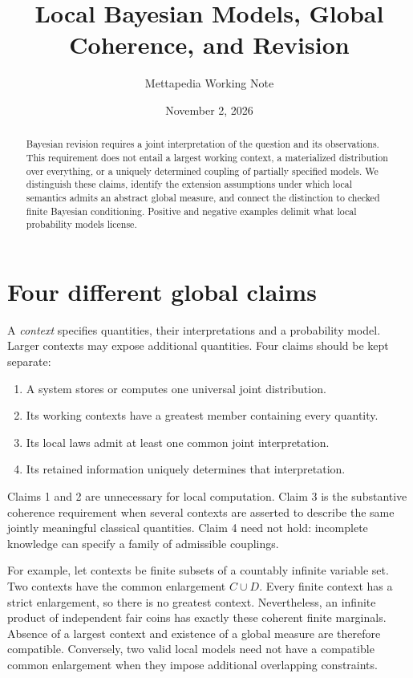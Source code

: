 \documentclass[11pt]{article}
\title{Local Bayesian Models, Global Coherence, and Revision}
\author{Mettapedia Working Note}
\date{November 2, 2026}
\begin{document}
\maketitle
\begin{abstract}
Bayesian revision requires a joint interpretation of the question and its
observations. This requirement does not entail a largest working context,
a materialized distribution over everything, or a uniquely determined coupling
of partially specified models. We distinguish these claims, identify the
extension assumptions under which local semantics admits an abstract global
measure, and connect the distinction to checked finite Bayesian conditioning.
Positive and negative examples delimit what local probability models license.
\end{abstract}

\section{Four different global claims}
A \emph{context} specifies quantities, their interpretations and a probability
model. Larger contexts may expose additional quantities. Four claims should
be kept separate:
\begin{enumerate}
\item A system stores or computes one universal joint distribution.
\item Its working contexts have a greatest member containing every quantity.
\item Its local laws admit at least one common joint interpretation.
\item Its retained information uniquely determines that interpretation.
\end{enumerate}
Claims 1 and 2 are unnecessary for local computation. Claim 3 is the substantive
coherence requirement when several contexts are asserted to describe the same
jointly meaningful classical quantities. Claim 4 need not hold: incomplete
knowledge can specify a family of admissible couplings.

For example, let contexts be finite subsets of a countably infinite variable
set. Two contexts have the common enlargement $C\cup D$. Every finite context
has a strict enlargement, so there is no greatest context. Nevertheless, an
infinite product of independent fair coins has exactly these coherent finite
marginals. Absence of a largest context and existence of a global measure are
therefore compatible. Conversely, two valid local models need not have a
compatible common enlargement when they impose additional overlapping
constraints.
\end{document}
